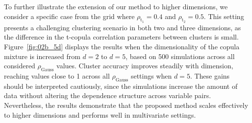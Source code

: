 \documentclass[12pt]{article}
\newcommand{\rhou}[1]{\rho_{\text{#1}}}
\begin{document}
To further illustrate the extension of our method to higher dimensions, we consider a specific case from the grid where $\rho_{\text{t}_1} = 0.4$ and $\rho_{\text{t}_2} = 0.5$. 
This setting presents a challenging clustering scenario in both two and three dimensions, as the difference in the t-copula correlation parameters between clusters is small. 
Figure~\ref{fig:02b_5d} displays the results when the dimensionality of the copula mixture is increased from $d = 2$ to $d = 5$, based on 500 simulations across all considered $\rhou{Gauss}$ values. 
Cluster accuracy improves steadily with dimension, reaching values close to 1 across all $\rhou{Gauss}$ settings when $d = 5$. 
These gains should be interpreted cautiously, since the simulations increase the amount of data without altering the dependence structure across variable pairs. 
Nevertheless, the results demonstrate that the proposed method scales effectively to higher dimensions and performs well in multivariate settings. 
\end{document}
